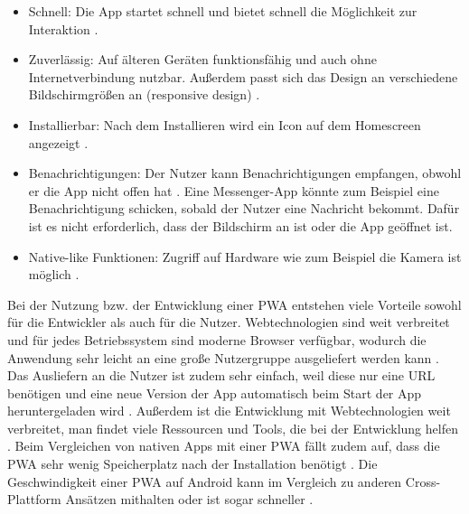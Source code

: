 \begin{itemize}
  \item Schnell: Die App startet schnell und bietet schnell die Möglichkeit zur Interaktion \autocite{Hajian2019} \autocite{Sheppard2017}.
  \item Zuverlässig: Auf älteren Geräten funktionsfähig und auch ohne Internetverbindung nutzbar. Außerdem passt sich das Design an verschiedene Bildschirmgrößen an (responsive design) \autocite{Hajian2019} \autocite{Sheppard2017}.
  \item Installierbar: Nach dem Installieren wird ein Icon auf dem Homescreen angezeigt \autocite{Hajian2019} \autocite{Sheppard2017} \autocite{Rojas2020}.
  \item Benachrichtigungen: Der Nutzer kann Benachrichtigungen empfangen, obwohl er die App nicht offen hat \autocite{Hajian2019} \autocite{Sheppard2017}. Eine Messenger-App könnte zum Beispiel eine Benachrichtigung schicken, sobald der Nutzer eine Nachricht bekommt. Dafür ist es nicht erforderlich, dass der Bildschirm an ist oder die App geöffnet ist.
  \item Native-like Funktionen: Zugriff auf Hardware wie zum Beispiel die Kamera ist möglich \autocite{Hajian2019}.
\end{itemize}

Bei der Nutzung bzw. der Entwicklung einer \ac{PWA} entstehen viele Vorteile sowohl für die Entwickler als auch für die Nutzer. Webtechnologien sind weit verbreitet und für jedes Betriebssystem sind moderne Browser verfügbar, wodurch die Anwendung sehr leicht an eine große Nutzergruppe ausgeliefert werden kann \autocite{Rojas2020}. Das Ausliefern an die Nutzer ist zudem sehr einfach, weil diese nur eine URL benötigen \autocite{KHAN2019289} und eine neue Version der App automatisch beim Start der App heruntergeladen wird \autocite{Rojas2020}. Außerdem ist die Entwicklung mit Webtechnologien weit verbreitet, man findet viele Ressourcen und Tools, die bei der Entwicklung helfen \autocite{Rojas2020}. Beim Vergleichen von nativen Apps mit einer \ac{PWA} fällt zudem auf, dass die \ac{PWA} sehr wenig Speicherplatz nach der Installation benötigt \autocite{biorn2017} \autocite{KHAN2019289}. Die Geschwindigkeit einer \ac{PWA} auf Android kann im Vergleich zu anderen Cross-Plattform Ansätzen mithalten oder ist sogar schneller \autocite{biorn2017}.


